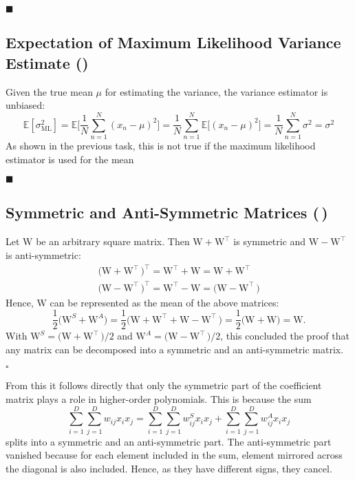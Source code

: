 \documentclass[11pt, a4paper]{scrartcl}
\newcommand{\E}{\mathbb{E}}
\newcommand{\transposed}{{\!\top\!}}
\newcommand{\mat}[1]{\bm{\mathrm{#1}}}
\newcommand{\qed}{\hfill\(\square\)}
\newcommand{\eot}{\hfill\(\blacksquare\)}
\newcommand{\diffstar}{\texorpdfstring{\raisebox{-1pt}{\resizebox{!}{8pt}{\(\star\)}}}{*}}
\newcommand{\onestar}  {(\diffstar)}
\newcommand{\twostar}  {(\diffstar\,\diffstar)}
\begin{document}
			\eot

		\subsection{Expectation of Maximum Likelihood Variance Estimate  \onestar}
			Given the true mean \(\mu\) for estimating the variance, the variance estimator is unbiased:
			\begin{equation}
				\E[\sigma^2_\mathrm{ML}]
					= \E\Bigg[ \frac{1}{N} \sum_{n = 1}^{N} (x_n - \mu)^2 \Bigg]
					= \frac{1}{N} \sum_{n = 1}^{N} \E\Big[ (x_n - \mu)^2 \Big]
					= \frac{1}{N} \sum_{n = 1}^{N} \sigma^2
					= \sigma^2
			\end{equation}
			As shown in the previous task, this is not true if the maximum likelihood estimator is used for the mean

			\eot

		\subsection{Symmetric and Anti-Symmetric Matrices  \twostar}
			Let \(\mat{W}\) be an arbitrary square matrix. Then \( \mat{W} + \mat{W}^\transposed \) is symmetric and \( \mat{W} - \mat{W}^\transposed \) is anti-symmetric:
			\begin{gather}
				\big( \mat{W} + \mat{W}^\transposed\, \big)^\transposed
					= \mat{W}^\transposed + \mat{W}
					= \mat{W} + \mat{W}^\transposed \\
				\big( \mat{W} - \mat{W}^\transposed\, \big)^\transposed
					= \mat{W}^\transposed - \mat{W}
					= \big( \mat{W} - \mat{W}^\transposed \,\big)
			\end{gather}
			Hence, \(\mat{W}\) can be represented as the mean of the above matrices:
			\begin{equation}
				\frac{1}{2} \big( \mat{W}^S + \mat{W}^A \big)
					= \frac{1}{2} \big( \mat{W} + \mat{W}^\transposed + \mat{W} - \mat{W}^\transposed\, \big)
					= \frac{1}{2} \big( \mat{W} + \mat{W} \big)
					= \mat{W}.
			\end{equation}
			With \( \mat{W}^S = \big( \mat{W} + \mat{W}^\transposed\, \big) / 2 \) and \( \mat{W}^A = \big( \mat{W} - \mat{W}^\transposed\, \big) / 2 \), this concluded the proof that any matrix can be decomposed into a symmetric and an anti-symmetric matrix.

			\qed

			From this it follows directly that only the symmetric part of the coefficient matrix plays a role in higher-order polynomials. This is because the sum
			\begin{equation}
				\sum_{i = 1}^{D} \sum_{j = 1}^{D} w_{ij} x_i x_j
				=
				\sum_{i = 1}^{D} \sum_{j = 1}^{D} w_{ij}^S x_i x_j
				+
				\sum_{i = 1}^{D} \sum_{j = 1}^{D} w_{ij}^A x_i x_j
			\end{equation}
			splits into a symmetric and an anti-symmetric part. The anti-symmetric part vanished because for each element included in the sum, element mirrored across the diagonal is also included. Hence, as they have different signs, they cancel.
\end{document}
